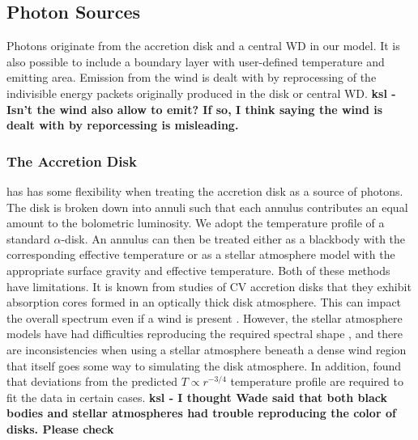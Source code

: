 \documentclass[preprint, a4paper, 11pt]{aastex}
\begin{document}
{\subsection{Photon Sources}

Photons originate from the accretion disk and a central WD in our model. It is also possible to include
a boundary layer with user-defined temperature and emitting area. Emission from the wind is dealt with
by reprocessing of the indivisible energy packets originally produced in the disk or central WD. {\bf ksl -Isn't the wind also allow to emit?  If so, I think saying the wind is dealt with by reporcessing is misleading.}

\subsubsection{The Accretion Disk}

\py has has some flexibility when treating the accretion disk as a source of photons. 
The disk is broken down into annuli 
such that each annulus contributes an equal amount to the bolometric luminosity. 
We adopt the temperature profile of a standard \cite{shakurasunyaev1973} $\alpha$-disk.
An annulus can then
be treated either as a blackbody with the corresponding effective temperature or as a stellar atmosphere model
with the appropriate surface gravity and effective temperature. 
Both of these methods have limitations. It is known
from studies of CV accretion disks that they exhibit absorption cores 
formed in an optically thick disk atmosphere.
This can impact the overall spectrum even if a wind is present 
\citep[see e.g.][]{dhillon1996}.
However, the stellar atmosphere models
have had difficulties reproducing the required spectral shape \citep{wade1988}, 
and there are inconsistencies when using a 
stellar atmosphere beneath a dense
wind region that itself goes some way to simulating the disk atmosphere. 
In addition, \cite{linnell2010} found that deviations from the predicted 
$T\propto r^{-3/4}$ temperature profile are required to fit the data
in certain cases.  {\bf ksl - I thought Wade said that both black bodies and stellar atmospheres had trouble reproducing the color of disks.  Please check}

}
\end{document}
